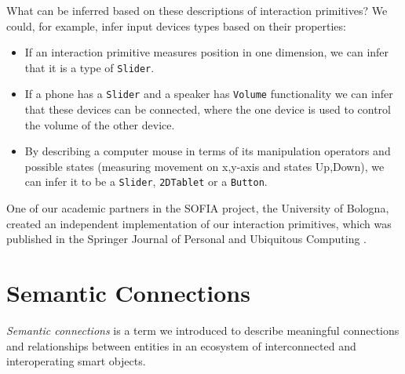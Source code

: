  
What can be inferred based on these descriptions of interaction primitives?  We could, for example, infer input devices types based on their properties:

\begin{itemize}
	\item If an interaction primitive measures position in one dimension, we can infer that it is a type of \texttt{Slider}.
	\item If a phone has a \texttt{Slider} and a speaker has \texttt{Volume} functionality we can infer that these devices can be connected, where the one device is used to control the volume of the other device.
	\item By describing a computer mouse in terms of its manipulation operators and possible states (measuring movement on x,y-axis and states {Up,Down}), we can infer it to be a \texttt{Slider}, \texttt{2DTablet} or a \texttt{Button}.
\end{itemize}


One of our academic partners in the \ac{SOFIA} project, the University of Bologna, created an independent implementation of our interaction primitives, which was published in the Springer Journal of Personal and Ubiquitous Computing \cite{Bartolini2011}.



\section{Semantic Connections}



\emph{Semantic connections} is a term we introduced \cite{VanderVlist2010,VanderVlist2010a} to describe meaningful connections and relationships between entities in an ecosystem of interconnected and interoperating smart objects. 

